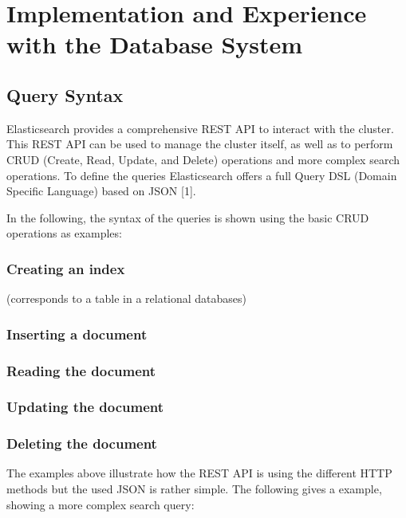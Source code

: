 \chapter{Implementation and Experience with the Database System}

\section{Query Syntax}
Elasticsearch provides a comprehensive REST API to interact with the cluster. This REST API can be used to manage the cluster itself, as well as to perform CRUD (Create, Read, Update, and Delete) operations and more complex search operations. To define the queries Elasticsearch offers a full Query DSL (Domain Specific Language) based on JSON [1].

In the following, the syntax of the queries is shown using the basic CRUD operations as examples:

\subsection*{Creating an index}
(corresponds to a table in a relational databases)

\subsection*{Inserting a document}

\subsection*{Reading the document}

\subsection*{Updating the document}

\subsection*{Deleting the document}

The examples above illustrate how the REST API is using the different HTTP methods but the used JSON is rather simple. The following gives a example, showing a more complex search query:
